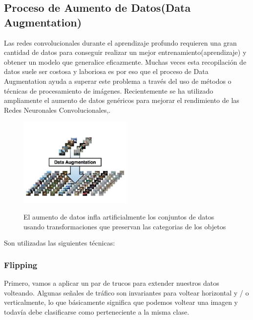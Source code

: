 	\subsection{Proceso de Aumento de Datos(Data Augmentation)}

		Las redes convolucionales durante el aprendizaje profundo requieren una gran cantidad de datos para conseguir realizar un mejor entrenamiento(aprendizaje) y obtener un modelo que generalice eficazmente. Muchas veces esta recopilación de datos suele ser costosa y laboriosa es por eso que el proceso de Data Augmentation ayuda a superar este problema a través del uso de métodos o técnicas de procesamiento de imágenes. Recientemente se ha utilizado ampliamente el aumento de datos genéricos para mejorar el rendimiento de las Redes Neuronales Convolucionales,\citep{DL_augmentData}. 

		\begin{figure}[H]
		\begin{center}
		\includegraphics[width=0.5\textwidth ]{images/desarrollo/Augment/exampleaug}
		\end{center}
		\begin{center}
		\caption{\small{El aumento de datos infla artificialmente los conjuntos de datos usando transformaciones que preservan las categorias de los objetos}}
		{\small{\citep{DL_augmentData}}}
		\end{center}
		\vspace{-1.5em}
		\end{figure}


		Son utilizadas las siguientes técnicas:
		
		
		\subsubsection{Flipping}
		
			Primero, vamos a aplicar un par de trucos para extender nuestros datos volteando. Algunas señales de tráfico son invariantes para voltear horizontal y / o verticalmente, lo que básicamente significa que podemos voltear una imagen y todavía debe clasificarse como perteneciente a la misma clase.

